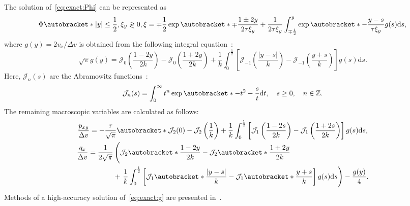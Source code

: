 \documentclass{elsarticle} %
\newcommand{\dd}{\mathrm{d}}
\DeclarePairedDelimiter\autobracket()       %
\newcommand{\br}[1]{\autobracket*{#1}}
\begin{document}
The solution of~\eqref{eq:exact:Phi} can be represented as
\begin{equation}\label{eq:exact:Phi_explicit}
    \Phi\br{ |y| \leq \frac12, \xi_y\gtrless0, \xi } = \mp\frac12\exp\br{ \mp\frac{1\pm2y}{2\tau\xi_y} } +
        \frac1{2\tau\xi_y} \int_{\mp\frac12}^y \exp\br{ -\frac{y-s}{\tau\xi_y} } g(s)\dd{s} ,
\end{equation}
where \(g(y) = 2v_x/\Delta v\) is obtained from the following integral equation~\cite{Willis1962}:
\begin{equation}\label{eq:exact:g}
    \sqrt{\pi} g(y) = \mathcal{J}_0 \left(\frac{1-2y}{2k}\right) - \mathcal{J}_0 \left(\frac{1+2y}{2k}\right)
        + \frac1k \int_0^{\frac12} \left[ \mathcal{J}_{-1}\left(\frac{|y-s|}{k}\right)
        - \mathcal{J}_{-1}\left(\frac{y+s}{k}\right) \right] g(s) \dd{s}.
\end{equation}
Here, \(\mathcal{J}_n(s)\) are the Abramowitz functions~\cite{Abramowitz1972}:
\begin{equation}\label{eq:exact:Abramowitz}
    \mathcal{J}_n(s) = \int_0^\infty t^n \exp\br{ -t^2-\frac{s}{t} } \dd t,
    \quad s\ge0, \quad n \in \mathbb{Z}.
\end{equation}
The remaining macroscopic variables are calculated as follows:
\begin{gather}
    \frac{p_{xy}}{\Delta v} = -\frac{\tau}{\sqrt{\pi}} \br{
        \mathcal{J}_2(0)-\mathcal{J}_2\left(\frac1k\right)
        + \frac1k\int_0^{\frac12}\left[
            \mathcal{J}_1\left(\frac{1-2s}{2k}\right)-\mathcal{J}_1\left(\frac{1+2s}{2k}\right)
        \right]g(s)\dd{s}
    }, \label{eq:exact:Pxy} \\
    \begin{aligned}
    \frac{q_x}{\Delta v} = \frac1{2\sqrt{\pi}} & \left(\vphantom{\int_0^{\frac12}}
        \mathcal{J}_2\br{ \frac{1-2y}{2k} } - \mathcal{J}_2\br{ \frac{1+2y}{2k} }\right. \\
        &+\left. \frac1k\int_0^{\frac12}\left[
            \mathcal{J}_1\br{ \frac{|y-s|}k } - \mathcal{J}_1\br{ \frac{y+s}k }
        \right]g(s)\dd{s}
    \right) - \frac{g(y)}4.
    \end{aligned} \label{eq:exact:qflow}
\end{gather}
Methods of a high-accuracy solution of~\eqref{eq:exact:g} are presented in~\cite{Luo2015, Luo2016}.


\end{document}
